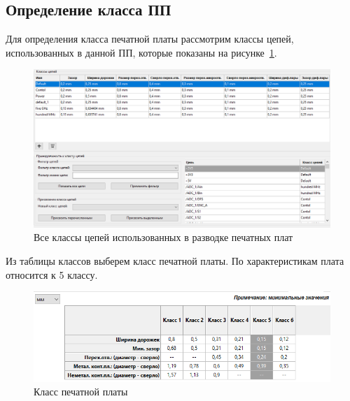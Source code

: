 \documentclass[utf8x, 14pt, oneside, a4paper]{article}
\begin{document}
		\subsection{Определение класса ПП}
		Для определения класса печатной платы рассмотрим классы цепей, использованных в данной ПП, которые показаны на рисунке~\ref{fig:классы цепей}.
		\begin{figure}[h!]
			\centering
			\includegraphics[width=0.7\linewidth]{"Класс цепей"}
			\caption{Все классы цепей использованных в разводке печатных плат}
			\label{fig:классы цепей}
		\end{figure}
	
		Из таблицы классов выберем класс печатной платы. По характеристикам плата относится к 5 классу.
		
		\begin{figure}[h!]
			\centering
			\includegraphics[width=0.7\linewidth]{"Класс печатных плат"}
			\caption{Класс печатной платы}
			\label{fig:Класс}
		\end{figure}
		
\end{document}
